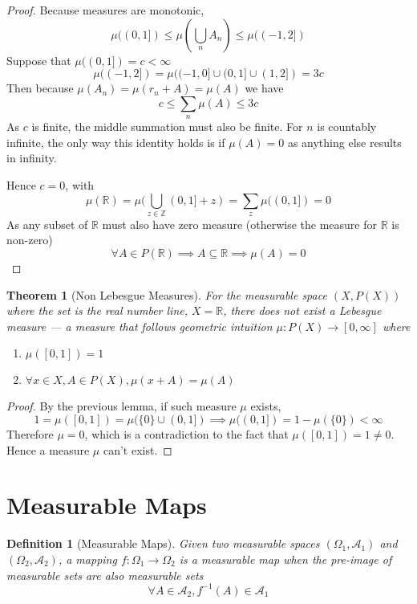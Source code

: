 \documentclass{article}
\newtheorem{theorem}{Theorem}[section]
\newtheorem{defi}{Definition}[section]
\begin{document}
\begin{proof}
    Because measures are monotonic,
    \[
        \mu((0, 1]) \leq \mu(\bigcup_n A_n) \leq \mu((-1, 2])
    \]
    Suppose that $\mu((0, 1]) = c < \infty$
    \[
        \mu((-1, 2]) = \mu((-1, 0] \cup (0, 1] \cup (1, 2]) = 3c
    \]
    Then because $\mu(A_n) = \mu(r_n + A) = \mu(A)$ we have
    \[
        c \leq \sum_n \mu(A) \leq 3c
    \]
    As $c$ is finite, the middle summation must also be finite. For $n$ is countably infinite, the only way this identity holds is if $\mu(A) = 0$ as anything else results in infinity.

    Hence $c = 0$, with
    \[
        \mu(\mathbb{R}) = \mu(\bigcup_{z \in \mathbb{Z}} (0, 1] + z ) = \sum_z \mu((0, 1]) = 0
    \]
    As any subset of $\mathbb{R}$ must also have zero measure (otherwise the measure for $\mathbb{R}$ is non-zero)
    \[
        \forall A \in P(\mathbb{R}) \implies A \subseteq \mathbb{R} \implies \mu(A) = 0
    \]

\end{proof}

\begin{theorem}[Non Lebesgue Measures]
    For the measurable space $(X, P(X))$ where the set is the real number line, $X = \mathbb{R}$, there does not exist a Lebesgue measure --- a measure that follows geometric intuition $\mu \colon P(X) \to [0,\infty]$ where
    \begin{enumerate}
        \item $\mu([0,1]) = 1$
        \item $\forall x \in X, A \in P(X), \mu(x+A) = \mu(A)$
    \end{enumerate}
\end{theorem}
\begin{proof}
    By the previous lemma, if such measure $\mu$ exists,
    \[
        1 = \mu([0,1]) = \mu(\{0\} \cup (0, 1]) \implies \mu((0, 1]) = 1 - \mu(\{0\}) < \infty
    \]
    Therefore $\mu = 0$, which is a contradiction to the fact that $\mu([0, 1]) = 1 \neq 0$. Hence a measure $\mu$ can't exist.
\end{proof}

\newpage
\section{Measurable Maps}
\begin{defi}[Measurable Maps]
    Given two measurable spaces $(\Omega_1, \mathcal A_1)$ and $(\Omega_2, \mathcal A_2)$, a mapping $f \colon \Omega_1 \to \Omega_2$ is a measurable map when the pre-image of measurable sets are also measurable sets
    \[
        \forall A \in \mathcal A_2, f^{-1}(A) \in \mathcal A_1
    \]
\end{defi}
\end{document}
